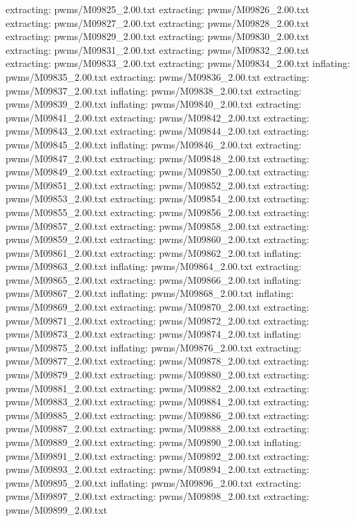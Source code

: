 \documentclass[letterpaper,10pt,english]{sphinxmanual}
\begin{document}
{\begin{sphinxVerbatim}[commandchars=\\\{\}]
 extracting: pwms/M09825\_2.00.txt
 extracting: pwms/M09826\_2.00.txt
 extracting: pwms/M09827\_2.00.txt
 extracting: pwms/M09828\_2.00.txt
 extracting: pwms/M09829\_2.00.txt
 extracting: pwms/M09830\_2.00.txt
 extracting: pwms/M09831\_2.00.txt
 extracting: pwms/M09832\_2.00.txt
 extracting: pwms/M09833\_2.00.txt
 extracting: pwms/M09834\_2.00.txt
  inflating: pwms/M09835\_2.00.txt
 extracting: pwms/M09836\_2.00.txt
 extracting: pwms/M09837\_2.00.txt
  inflating: pwms/M09838\_2.00.txt
 extracting: pwms/M09839\_2.00.txt
  inflating: pwms/M09840\_2.00.txt
 extracting: pwms/M09841\_2.00.txt
 extracting: pwms/M09842\_2.00.txt
 extracting: pwms/M09843\_2.00.txt
 extracting: pwms/M09844\_2.00.txt
 extracting: pwms/M09845\_2.00.txt
  inflating: pwms/M09846\_2.00.txt
 extracting: pwms/M09847\_2.00.txt
 extracting: pwms/M09848\_2.00.txt
 extracting: pwms/M09849\_2.00.txt
 extracting: pwms/M09850\_2.00.txt
 extracting: pwms/M09851\_2.00.txt
 extracting: pwms/M09852\_2.00.txt
 extracting: pwms/M09853\_2.00.txt
 extracting: pwms/M09854\_2.00.txt
 extracting: pwms/M09855\_2.00.txt
 extracting: pwms/M09856\_2.00.txt
 extracting: pwms/M09857\_2.00.txt
 extracting: pwms/M09858\_2.00.txt
 extracting: pwms/M09859\_2.00.txt
 extracting: pwms/M09860\_2.00.txt
 extracting: pwms/M09861\_2.00.txt
 extracting: pwms/M09862\_2.00.txt
  inflating: pwms/M09863\_2.00.txt
  inflating: pwms/M09864\_2.00.txt
 extracting: pwms/M09865\_2.00.txt
 extracting: pwms/M09866\_2.00.txt
  inflating: pwms/M09867\_2.00.txt
  inflating: pwms/M09868\_2.00.txt
  inflating: pwms/M09869\_2.00.txt
 extracting: pwms/M09870\_2.00.txt
 extracting: pwms/M09871\_2.00.txt
 extracting: pwms/M09872\_2.00.txt
 extracting: pwms/M09873\_2.00.txt
 extracting: pwms/M09874\_2.00.txt
  inflating: pwms/M09875\_2.00.txt
  inflating: pwms/M09876\_2.00.txt
 extracting: pwms/M09877\_2.00.txt
 extracting: pwms/M09878\_2.00.txt
 extracting: pwms/M09879\_2.00.txt
 extracting: pwms/M09880\_2.00.txt
 extracting: pwms/M09881\_2.00.txt
 extracting: pwms/M09882\_2.00.txt
 extracting: pwms/M09883\_2.00.txt
 extracting: pwms/M09884\_2.00.txt
 extracting: pwms/M09885\_2.00.txt
 extracting: pwms/M09886\_2.00.txt
 extracting: pwms/M09887\_2.00.txt
 extracting: pwms/M09888\_2.00.txt
 extracting: pwms/M09889\_2.00.txt
 extracting: pwms/M09890\_2.00.txt
  inflating: pwms/M09891\_2.00.txt
 extracting: pwms/M09892\_2.00.txt
 extracting: pwms/M09893\_2.00.txt
 extracting: pwms/M09894\_2.00.txt
 extracting: pwms/M09895\_2.00.txt
  inflating: pwms/M09896\_2.00.txt
 extracting: pwms/M09897\_2.00.txt
 extracting: pwms/M09898\_2.00.txt
 extracting: pwms/M09899\_2.00.txt

\end{sphinxVerbatim}}
\end{document}
